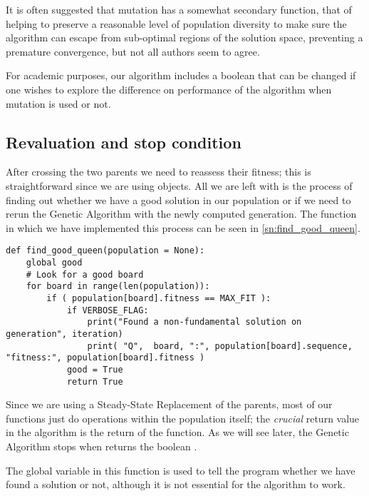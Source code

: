 It is often suggested that mutation has a somewhat secondary function, that of helping to preserve a reasonable level of population diversity to make sure the algorithm can escape from sub-optimal regions of the solution space, preventing a premature convergence, but not all authors seem to agree.

For academic purposes, our algorithm includes a boolean  that can be changed if one wishes to explore the difference on performance of the algorithm when mutation is used or not.

\subsection{Revaluation and stop condition}\label{sec:stop-cond}

After crossing the two parents we need to reassess their fitness; this is straightforward since we are using objects. All we are left with is the process of finding out whether we have a good solution in our population or if we need to rerun the Genetic Algorithm with the newly computed generation. The function in which we have implemented this process can be seen in \cref{sn:find_good_queen}.

\begin{lstlisting}[label=sn:find_good_queen, caption=Function to stop the program when we find a good solution]
def find_good_queen(population = None):
	global good
	# Look for a good board
	for board in range(len(population)):
		if ( population[board].fitness == MAX_FIT ):
			if VERBOSE_FLAG:
				print("Found a non-fundamental solution on generation", iteration)
				print( "Q",  board, ":", population[board].sequence, "fitness:", population[board].fitness )
			good = True
			return True
\end{lstlisting}

Since we are using a Steady-State Replacement of the parents, most of our functions just do operations within the population itself; the \emph{crucial} return value in the algorithm is the return of the  function. As we will see later, the Genetic Algorithm stops when  returns the boolean .

The global  variable in this function is used to tell the program whether we have found a solution or not, although it is not essential for the algorithm to work.

